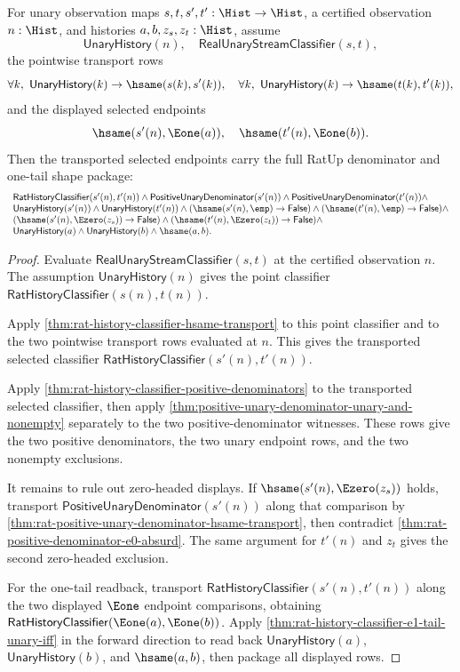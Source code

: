 \begin{theorem}
\label{thm:real-unary-streamname-transported-selected-endpoint-shape-package}
For unary observation maps $s,t,s',t':\Hist\to\Hist$, a certified observation
$n:\Hist$, and histories $a,b,z_s,z_t:\Hist$, assume
$$
\mathsf{UnaryHistory}(n),\quad
\mathsf{RealUnaryStreamClassifier}(s,t),
$$
the pointwise transport rows
$$
\forall k,\ \mathsf{UnaryHistory}(k)\to\hsame(s(k),s'(k)),
\quad
\forall k,\ \mathsf{UnaryHistory}(k)\to\hsame(t(k),t'(k)),
$$
and the displayed selected endpoints
$$
\hsame(s'(n),\Eone(a)),\quad \hsame(t'(n),\Eone(b)).
$$
Then the transported selected endpoints carry the full RatUp denominator and
one-tail shape package:
$$
\begin{array}{l}
\mathsf{RatHistoryClassifier}(s'(n),t'(n))\land
\mathsf{PositiveUnaryDenominator}(s'(n))\land
\mathsf{PositiveUnaryDenominator}(t'(n))\land\\
\mathsf{UnaryHistory}(s'(n))\land
\mathsf{UnaryHistory}(t'(n))\land
(\hsame(s'(n),\emp)\to\mathsf{False})\land
(\hsame(t'(n),\emp)\to\mathsf{False})\land\\
(\hsame(s'(n),\Ezero(z_s))\to\mathsf{False})\land
(\hsame(t'(n),\Ezero(z_t))\to\mathsf{False})\land\\
\mathsf{UnaryHistory}(a)\land
\mathsf{UnaryHistory}(b)\land
\hsame(a,b).
\end{array}
$$
\end{theorem}
\begin{proof}
Evaluate $\mathsf{RealUnaryStreamClassifier}(s,t)$ at the certified observation
$n$. The assumption $\mathsf{UnaryHistory}(n)$ gives the point classifier
$\mathsf{RatHistoryClassifier}(s(n),t(n))$.

Apply \autoref{thm:rat-history-classifier-hsame-transport} to this point
classifier and to the two pointwise transport rows evaluated at $n$. This gives
the transported selected classifier
$\mathsf{RatHistoryClassifier}(s'(n),t'(n))$.

Apply \autoref{thm:rat-history-classifier-positive-denominators} to the
transported selected classifier, then apply
\autoref{thm:positive-unary-denominator-unary-and-nonempty} separately to the two
positive-denominator witnesses. These rows give the two positive denominators,
the two unary endpoint rows, and the two nonempty exclusions.

It remains to rule out zero-headed displays. If $\hsame(s'(n),\Ezero(z_s))$
holds, transport $\mathsf{PositiveUnaryDenominator}(s'(n))$ along that comparison
by \autoref{thm:rat-positive-unary-denominator-hsame-transport}, then contradict
\autoref{thm:rat-positive-denominator-e0-absurd}. The same argument for $t'(n)$
and $z_t$ gives the second zero-headed exclusion.

For the one-tail readback, transport
$\mathsf{RatHistoryClassifier}(s'(n),t'(n))$ along the two displayed
$\Eone$ endpoint comparisons, obtaining
$\mathsf{RatHistoryClassifier}(\Eone(a),\Eone(b))$. Apply
\autoref{thm:rat-history-classifier-e1-tail-unary-iff} in the forward direction
to read back $\mathsf{UnaryHistory}(a)$, $\mathsf{UnaryHistory}(b)$, and
$\hsame(a,b)$, then package all displayed rows.
\end{proof}
